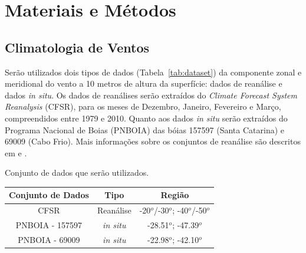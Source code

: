 \chapter{Materiais e Métodos}
\label{anexoB}

\section{Climatologia de Ventos}
\label{sec:windClimatology}

\hspace{6mm} Serão utilizados dois tipos de dados (Tabela~\ref{tab:dataset}) da componente
zonal e meridional do vento a 10 metros de altura da superfície: dados de reanálise e
dados \textit{in situ}. Os dados de reanálises serão extraídos do \textit{Climate
Forecast System Reanalysis} (CFSR), para os meses de Dezembro, Janeiro, Fevereiro e
Março, compreendidos entre 1979 e 2010. Quanto aos dados \textit{in situ}
serão extraídos do Programa Nacional de Boias (PNBOIA) das bóias 157597 (Santa Catarina)
e 69009 (Cabo Frio). Mais informações sobre os conjuntos de reanálise são descritos em
\cite{Saha2010} e \cite{Berrisford2011}.

\bigskip
\begin{center}
\begin{tablehere}
\caption{Conjunto de dados que serão utilizados.}
\label{tab:dataset}
\begin{tabular}{|c|c|c|}

\hline
\textbf{Conjunto de Dados}                   & \textbf{Tipo}    & \textbf{Região}      \\ \hline
CFSR    & Reanálise        & -20$^o$/-30$^o$; -40$^o$/-50$^o$ \\ \hline
PNBOIA - 157597 & \textit{in situ} & -28.51$^o$; -47.39$^o$     \\ \hline
PNBOIA - 69009  & \textit{in situ} & -22.98$^o$; -42.10$^o$     \\ \hline
\end{tabular}
\end{tablehere}
\bigskip
\end{center}

